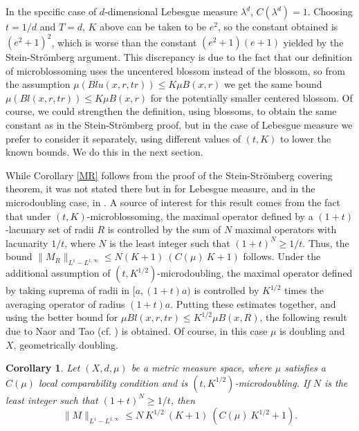 \documentclass[12pt]{amsart}
\newtheorem{corollary}[theorem]{Corollary}
\theoremstyle{definition}
\theoremstyle{parrafo}
\begin{document}
 In the specific case of $d$-dimensional Lebesgue measure $\lambda^d$,  $C(\lambda^d) = 1$.
Choosing
 $t = 1/d$
 and $T = d$,
 $K$ above can be taken to be $e^2$, so the constant obtained
 is $(e^2+1)^2$, which is worse than the constant $(e^2 + 1) (e + 1)$ yielded by the
Stein-Str\"omberg argument. This discrepancy is due
to the fact  that our definition of microblossoming
uses the uncentered blossom instead of the blossom, so from the assumption $\mu (Blu \left(x, r,  t r \right)) \le K \mu B(x,r)$
we  get the same bound $\mu (Bl \left(x, r,  t r \right)) \le K \mu B(x,r)$  for the potentially smaller
centered blossom. Of course, we could strengthen the definition, using blossoms,  to obtain the same 
constant as in the Stein-Str\"omberg proof, but in the case of Lebesgue measure
we prefer to consider it separately, using different values of $(t, K)$ to lower the known bounds. We do this in the next section.



  
  While Corollary \ref{MR}  follows from the
  proof of the Stein-Str\"omberg covering theorem, it was not stated there but in \cite[Lemma 4]{MeSo} for Lebesgue
measure,
  and in the microdoubling case, in \cite[Corollary 1.2]{NaTa}. A source of  interest for this result comes from the fact that under
$(t,K)$-microblossoming, the maximal operator defined by a $(1 +  t)$-lacunary set of radii $R$ 
is controlled by the sum of $N$ maximal operators with lacunarity $1/t$, where $N$ is the
least integer such that $(1 + t)^N \ge 1/t$. Thus, the bound 
$\|M_R\|_{L^1-L^{1,\infty}} \le  N (K + 1) \ (C(\mu) \ K + 1)$ follows. Under the
additional assumption of $(t, K^{1/2})$-microdoubling, the maximal operator defined by
taking suprema of radii in $[a, (1 + t) a)$ is controlled by $ K^{1/2}$ times the averaging operator 
of radius $(1 + t) a$.
Putting these estimates together, and using the better bound for 
$\mu Bl(x, r, tr)\le  K^{1/2} \mu B(x,R)$, the following result due to  Naor and Tao (cf. \cite[Corollary 1.2]{NaTa})  is obtained. 
Of course, in this case $\mu$ is doubling and $X$, geometrically doubling.


\begin{corollary}  Let $(X, d, \mu)$ be a metric measure space, where $\mu$ satisfies a $C(\mu)$ local comparability condition
and is $(t, K^{1/2})$-microdoubling.
If $N$ is the
least integer such that $(1 + t)^N \ge 1/t$, then
$$\|M\|_{L^1-L^{1,\infty}} \le N \ K^{1/2} \ (K + 1) \ (C(\mu) \ K^{1/2} + 1).$$
 \end{corollary}
\end{document}
